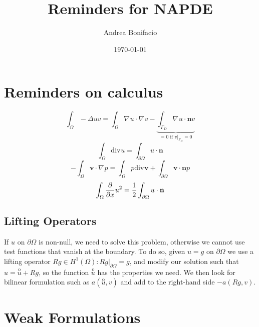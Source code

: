 \documentclass[a4paper,11pt]{article}
\theoremstyle{break}
\renewcommand*{\grad}{\nabla\mspace{1mu}}
\renewcommand*{\div}{\text{div}\mspace{1mu}}
\newcommand{\vect}[1]{\textbf{#1}}
\newcommand*{\txt}[1]{\text{#1}}
\newcommand*{\limited}[1]{\vert_{#1}}
\newcommand{\boundary}{{\partial\Omega}}
\newcommand{\onehalf}{\frac{1}{2}}
\newcommand{\normal}{\vect{n}}
\newcommand{\vvec}{\vect{v}}
\numberwithin{equation}{section}
\begin{document}
\title{Reminders for NAPDE}
\author{Andrea Bonifacio}
\date{\today}
\maketitle
\section*{Reminders on calculus}
\[
    \int_\Omega-\Delta u v = \int_\Omega \grad u \cdot \grad v - \underbrace{\int_{\Gamma_D}  \grad u \cdot \vect{n} v}_{= 0 \txt{ if } v\vert_{\Gamma_D} = 0}
\]
\[
    \int_\Omega \div u = \int_\boundary u \cdot \vect{n} 
\]
\[
    -\int_\Omega \vect{v} \cdot \grad p = \int_\Omega p\div \vect{v} + \int_\boundary \vvec \cdot \normal p
\]
\[
    \int_\Omega \pderivative{x}u^2 = \onehalf \int_\boundary u\cdot \normal  
\]
\subsection*{Lifting Operators}
If \(u\) on \(\boundary\) is non-null, we need to solve this problem, otherwise we cannot use test functions that vanish at the boundary. To do so, given \(u = g \txt{ on }\boundary\) we use a lifting operator \(Rg \in H^1(\Omega) : Rg\limited{\boundary} = g\), and modify our solution such that \(u = \overset{\mathrm{o}}{u} + Rg\), so the function \(\overset{\mathrm{o}}{u}\) has the properties we need. We then look for bilinear formulation such as \(a(\overset{\mathrm{o}}{u}, v)\) and add to the right-hand side \(-a(Rg, v)\).
\section*{Weak Formulations}
\end{document}
